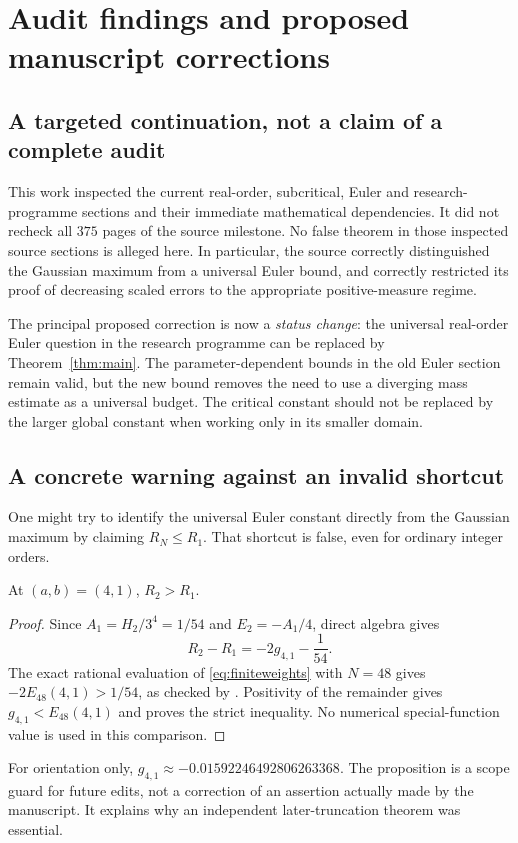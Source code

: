 \section{Audit findings and proposed manuscript corrections}
\label{sec:audit}
\subsection{A targeted continuation, not a claim of a complete audit}
This work inspected the current real-order, subcritical, Euler and research-programme sections and their immediate mathematical dependencies. It did not recheck all $375$ pages of the source milestone. No false theorem in those inspected source sections is alleged here. In particular, the source correctly distinguished the Gaussian maximum from a universal Euler bound, and correctly restricted its proof of decreasing scaled errors to the appropriate positive-measure regime.

The principal proposed correction is now a \emph{status change}: the universal real-order Euler question in the research programme can be replaced by Theorem~\ref{thm:main}. The parameter-dependent bounds in the old Euler section remain valid, but the new bound removes the need to use a diverging mass estimate as a universal budget. The critical constant should not be replaced by the larger global constant when working only in its smaller domain.

\subsection{A concrete warning against an invalid shortcut}
One might try to identify the universal Euler constant directly from the Gaussian maximum by claiming $R_N\le R_1$. That shortcut is false, even for ordinary integer orders.
\begin{proposition}\label{prop:nonmonotone}
At $(a,b)=(4,1)$, $R_2>R_1$.
\end{proposition}
\begin{proof}
Since $A_1=H_2/3^4=1/54$ and $E_2=-A_1/4$, direct algebra gives
\[
 R_2-R_1=-2g_{4,1}-\frac1{54}.
\]
The exact rational evaluation of \eqref{eq:finiteweights} with $N=48$ gives
$-2E_{48}(4,1)>1/54$, as checked by . Positivity of the remainder gives $g_{4,1}<E_{48}(4,1)$ and proves the strict inequality. No numerical special-function value is used in this comparison.
\end{proof}
For orientation only, $g_{4,1}\approx-0.01592246492806263368$. The proposition is a scope guard for future edits, not a correction of an assertion actually made by the manuscript. It explains why an independent later-truncation theorem was essential.

